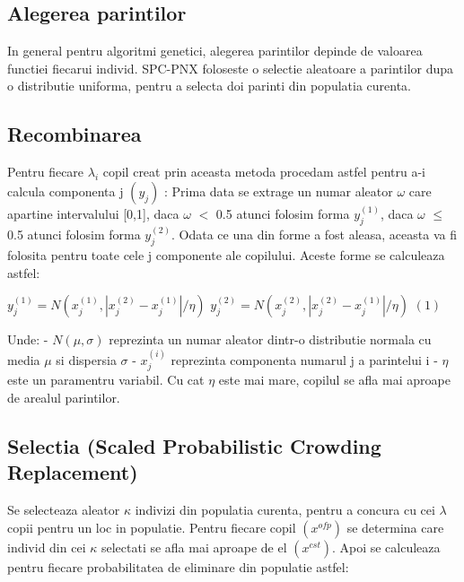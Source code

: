 \documentclass[a4paper]{article}
\begin{document}
\subsection{Alegerea parintilor}
In general pentru algoritmi genetici, alegerea parintilor depinde de valoarea functiei fiecarui individ. SPC-PNX foloseste o selectie aleatoare a parintilor dupa o distributie uniforma, pentru a selecta doi parinti din populatia curenta.

\subsection{Recombinarea}
Pentru fiecare  $\lambda_i$ copil creat prin aceasta metoda procedam astfel pentru a-i calcula componenta j $(y_{j})$ : Prima data se extrage un numar aleator $\omega$ care apartine intervalului [0,1], daca $\omega$ $<$ 0.5  atunci folosim forma $y_{j}^{(1)}$, daca $\omega$ $\leq$ 0.5 atunci folosim forma $y_{j}^{(2)}$. Odata ce una din forme a fost aleasa, aceasta va fi folosita pentru toate cele j componente ale copilului. Aceste forme se calculeaza astfel:  \vspace{5mm}

\centerline{$y_{j}^{(1)} = N(x_{j}^{(1)}, |x_{j}^{(2)} - x_{j}^{(1)}|/\eta)$ \hspace{1cm} $y_{j}^{(2)} = N(x_{j}^{(2)}, |x_{j}^{(2)} - x_{j}^{(1)}|/\eta)$ \hspace{1cm}$(1)$ } \vspace{5mm}

Unde:
\newline
- $N(\mu,\sigma)$ reprezinta un numar aleator dintr-o distributie normala cu media $\mu$ si dispersia $\sigma$
\newline
- $x_{j}^{(i)}$ reprezinta componenta numarul j a parintelui i
\newline
- $\eta$ este un paramentru variabil. Cu cat $\eta$ este mai mare, copilul se afla mai aproape de arealul parintilor.
\newpage

\subsection{Selectia (Scaled Probabilistic Crowding Replacement)}
Se selecteaza aleator $\kappa$ indivizi din populatia curenta, pentru a concura cu cei $\lambda$ copii pentru un loc in populatie.
\newline
Pentru fiecare copil $(x^{ofp})$ se determina care individ din cei $\kappa$ selectati se afla mai aproape de el  $(x^{cst})$. Apoi se calculeaza pentru fiecare probabilitatea de eliminare din populatie astfel: \vspace{5mm}
\end{document}
